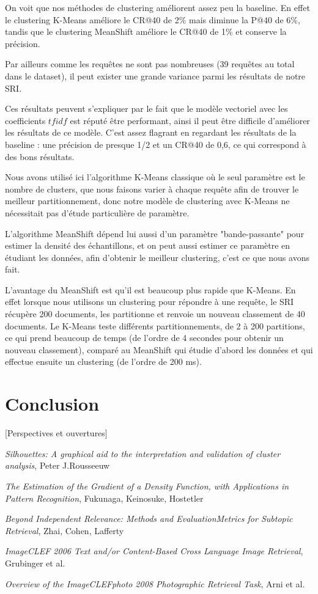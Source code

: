 \documentclass{article}
\begin{document}
On voit que nos méthodes de clustering améliorent assez peu la baseline. En effet le clustering K-Means améliore le CR@40 de 2\% mais diminue la P@40 de 6\%, tandis que le clustering MeanShift améliore le CR@40 de 1\% et conserve la précision. 

Par ailleurs comme les requêtes ne sont pas nombreuses (39 requêtes au total dans le dataset), il peut exister une grande variance parmi les résultats de notre SRI.

Ces résultats peuvent s'expliquer par le fait que le modèle vectoriel avec les coefficients $tfidf$ est réputé être performant, ainsi il peut être difficile d'améliorer les résultats de ce modèle. C'est assez flagrant en regardant les résultats de la baseline : une précision de presque 1/2 et un CR@40 de 0,6, ce qui correspond à des bons résultats.

Nous avons utilisé ici l'algorithme K-Means classique où le seul paramètre est le nombre de clusters, que nous faisons varier à chaque requête afin de trouver le meilleur partitionnement, donc notre modèle de clustering avec K-Means ne nécessitait pas d'étude particulière de paramètre.

L'algorithme MeanShift dépend lui aussi d'un paramètre "bande-passante" pour estimer la densité des échantillons, et on peut aussi estimer ce paramètre en étudiant les données, afin d'obtenir le meilleur clustering, c'est ce que nous avons fait.

L'avantage du MeanShift est qu'il est beaucoup plus rapide que K-Means. En effet lorsque nous utilisons un clustering pour répondre à une requête, le SRI récupère 200 documents, les partitionne et renvoie un nouveau classement de 40 documents.
Le K-Means teste différents partitionnements, de 2 à 200 partitions, ce qui prend beaucoup de temps (de l'ordre de 4 secondes pour obtenir un nouveau classement), comparé au MeanShift qui étudie d'abord les données et qui effectue ensuite un clustering (de l'ordre de 200 ms).

\section{Conclusion}

[Perspectives et ouvertures]

\begin{thebibliography}{9}
\textit{Silhouettes: A graphical aid to the interpretation and validation of cluster analysis},
Peter J.Rousseeuw

\textit{The Estimation of the Gradient of a Density Function, with Applications in Pattern Recognition}, Fukunaga, Keinosuke, Hostetler

\textit{Beyond Independent Relevance: Methods and EvaluationMetrics for Subtopic Retrieval}, Zhai, Cohen, Lafferty

\textit{ImageCLEF 2006
Text and/or Content-Based Cross Language Image Retrieval}, Grubinger et al.

\textit{Overview of the ImageCLEFphoto 2008  
Photographic Retrieval Task}, Arni et al.
\end{thebibliography}
\end{document}
